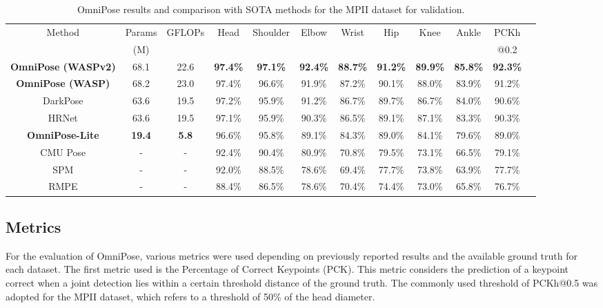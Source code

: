 \documentclass[10pt,twocolumn,letterpaper]{article}
\begin{document}
\begin{table*}[!ht]
\begin{center}
\begin{tabular}{|c|c|c|c|c|c|c|c|c|c|c|c|}
\hline
\multirow{2}{*}{Method}&Params&\multirow{2}{*}{GFLOPs}&\multirow{2}{*}{Head}&\multirow{2}{*}{Shoulder}&\multirow{2}{*}{Elbow}&\multirow{2}{*}{Wrist}&\multirow{2}{*}{Hip}&\multirow{2}{*}{Knee}&\multirow{2}{*}{Ankle}&PCKh\\
&(M)&&&&&&&&&@0.2\\
\hline\hline
\textbf{OmniPose (WASPv2)}&68.1&22.6&
\textbf{97.4\%}&\textbf{97.1\%}&
\textbf{92.4\%}&\textbf{88.7\%}&
\textbf{91.2\%}&\textbf{89.9\%}&
\textbf{85.8\%}&\textbf{92.3\%}\\
\textbf{OmniPose (WASP)}&68.2&23.0&
97.4\%&96.6\%&
91.9\%&87.2\%&
90.1\%&88.0\%&
83.9\%&91.2\%\\
DarkPose \cite{DarkPose}&63.6&19.5&
97.2\%&95.9\%&
91.2\%&86.7\%&
89.7\%&86.7\%&
84.0\%&90.6\%\\
HRNet \cite{HRNet}&63.6&19.5&
97.1\%&95.9\%&
90.3\%&86.5\%&
89.1\%&87.1\%&
83.3\%&90.3\%\\
\textbf{OmniPose-Lite}&
\textbf{19.4}&
\textbf{5.8}&
96.6\%&95.8\%&
89.1\%&84.3\%&
89.0\%&84.1\%&
79.6\%&89.0\%\\
CMU Pose \cite{OpenPose}&-&-&
92.4\%&90.4\%&
80.9\%&70.8\%&
79.5\%&73.1\%&
66.5\%&79.1\%\\
SPM \cite{SPM}&-&-&
92.0\%&88.5\%&
78.6\%&69.4\%&
77.7\%&73.8\%&
63.9\%&77.7\%\\
RMPE \cite{RMPE}&-&-&
88.4\%&86.5\%&
78.6\%&70.4\%&
74.4\%&73.0\%&
65.8\%&76.7\%\\
\hline
\end{tabular}
\end{center}
\caption{OmniPose results and comparison with SOTA methods for the MPII dataset for validation.}
\label{tab:MPIIval}
\end{table*}

\subsection{Metrics}
For the evaluation of OmniPose, various metrics were used depending on previously reported results and the available ground truth for each dataset.
The first metric used is the Percentage of Correct Keypoints (PCK). This metric considers the prediction of a keypoint correct when a joint detection lies within a certain threshold distance of the ground truth. 
The commonly used threshold of PCKh@0.5 was adopted for the MPII dataset, which refers to a threshold of 50\% of the head diameter.
\end{document}
